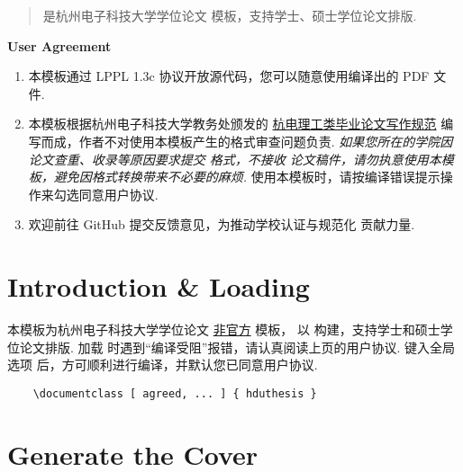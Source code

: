 \documentclass[l3doc]{hduthesis}
\begin{document}
\maketitle

\begin{abstract}
   是杭州电子科技大学学位论文  模板，支持学士、硕士学位论文排版.
\end{abstract}

\begin{center}
  \small\bfseries User Agreement
\end{center}
\begin{enumerate}\small
  \item 本模板通过 LPPL 1.3c 协议开放源代码，您可以随意使用编译出的 PDF 文件.
  \item 本模板根据杭州电子科技大学教务处颁发的 \href{https://jwc.hdu.edu.cn/2022/0428/c4528a153813/page.htm}{杭电理工类毕业论文写作规范} 编写而成，作者不对使用本模板产生的格式审查问题负责. \emph{如果您所在的学院因论文查重、收录等原因要求提交  格式，不接收  论文稿件，请勿执意使用本模板，避免因格式转换带来不必要的麻烦.} 使用本模板时，请按编译错误提示操作来勾选同意用户协议.
  \item 欢迎前往 GitHub 提交反馈意见，为推动学校认证与规范化  贡献力量.
\end{enumerate}
\endtitlepage
\restoregeometry

\section{Introduction \& Loading }

本模板为杭州电子科技大学学位论文 \underline{非官方}  模板，
以  构建，支持学士和硕士学位论文排版.
加载  时遇到``编译受阻''报错，请认真阅读上页的用户协议.
键入全局选项  后，方可顺利进行编译，并默认您已同意用户协议.

\begin{framed}
  \begin{verbatim}
    \documentclass [ agreed, ... ] { hduthesis }
  \end{verbatim}
\end{framed}

\section{Generate the Cover}
\end{document}
